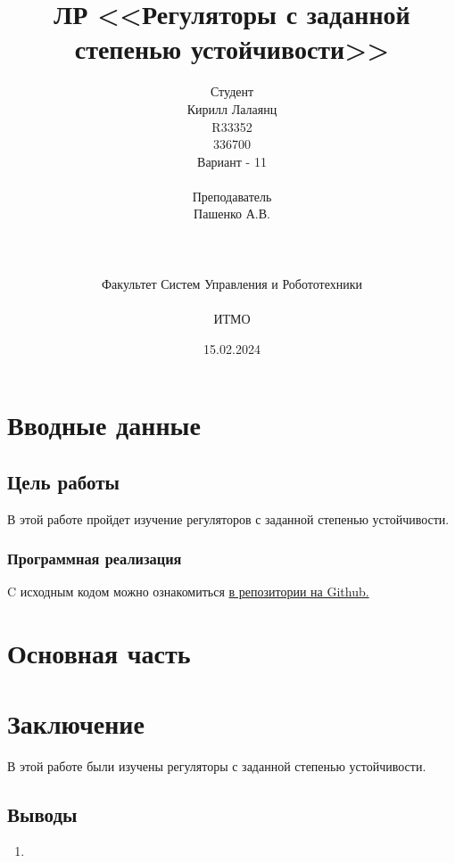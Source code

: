 \documentclass[16pt]{article}
\title{ЛР \textnumero 9 <<Регуляторы с заданной степенью устойчивости>>}
\author{
Студент \\
Кирилл Лалаянц\\
R33352\\
336700\\
Вариант - 11\\
\\
Преподаватель\\
Пашенко А.В. \\
\\
\\
\\
Факультет Систем Управления и Робототехники\\
\\
ИТМО\\
}
\date{15.02.2024}
\begin{document}
\maketitle
\newpage
\tableofcontents
\thispagestyle{empty}

\newpage
\setcounter{page}{1}
\section{Вводные данные}
\subsection{Цель работы}
В этой работе пройдет изучение регуляторов с заданной степенью устойчивости.

\subsubsection{Программная реализация}
C исходным кодом можно ознакомиться \href{https://github.com/lalayants/control-theory-itmo-2023-2024}{в репозитории на Github.}


\newpage
\section{Основная часть}

\FloatBarrier
\newpage

\FloatBarrier
\newpage
% 


\newpage
\section{Заключение}
В этой работе были изучены регуляторы с заданной степенью устойчивости.
\subsection{Выводы}
\begin{enumerate}
   \item 
\end{enumerate}
\end{document}
